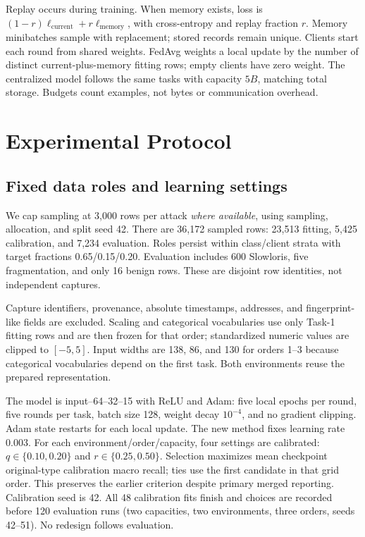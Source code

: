 \documentclass[journal,10pt]{IEEEtran}
\begin{document}
Replay occurs during training. When memory exists, loss is $(1-r)\ell_{\mathrm{current}}+r\ell_{\mathrm{memory}}$, with cross-entropy and replay fraction $r$. Memory minibatches sample with replacement; stored records remain unique. Clients start each round from shared weights. FedAvg weights a local update by the number of distinct current-plus-memory fitting rows; empty clients have zero weight. The centralized model follows the same tasks with capacity $5B$, matching total storage. Budgets count examples, not bytes or communication overhead.

\section{Experimental Protocol}
\subsection{Fixed data roles and learning settings}
We cap sampling at 3,000 rows per attack \emph{where available}, using sampling, allocation, and split seed 42. There are 36,172 sampled rows: 23,513 fitting, 5,425 calibration, and 7,234 evaluation. Roles persist within class/client strata with target fractions 0.65/0.15/0.20. Evaluation includes 600 Slowloris, five fragmentation, and only 16 benign rows. These are disjoint row identities, not independent captures.

Capture identifiers, provenance, absolute timestamps, addresses, and fingerprint-like fields are excluded. Scaling and categorical vocabularies use only Task-1 fitting rows and are then frozen for that order; standardized numeric values are clipped to $[-5,5]$. Input widths are 138, 86, and 130 for orders 1--3 because categorical vocabularies depend on the first task. Both environments reuse the prepared representation.

The model is input--64--32--15 with ReLU and Adam: five local epochs per round, five rounds per task, batch size 128, weight decay $10^{-4}$, and no gradient clipping. Adam state restarts for each local update. The new method fixes learning rate 0.003. For each environment/order/capacity, four settings are calibrated: $q\in\{0.10,0.20\}$ and $r\in\{0.25,0.50\}$. Selection maximizes mean checkpoint original-type calibration macro recall; ties use the first candidate in that grid order. This preserves the earlier criterion despite primary merged reporting. Calibration seed is 42. All 48 calibration fits finish and choices are recorded before 120 evaluation runs (two capacities, two environments, three orders, seeds 42--51). No redesign follows evaluation.
\end{document}
